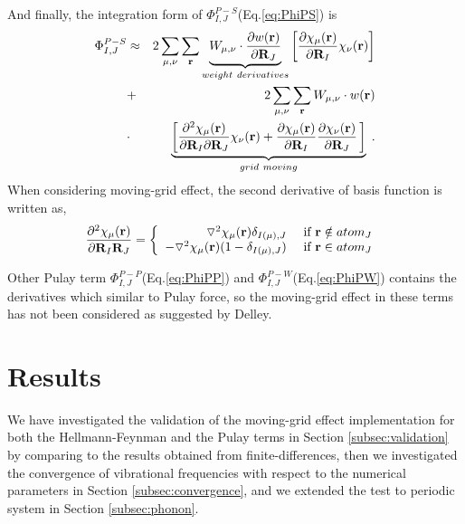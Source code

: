 \documentclass[journal=jpca,manuscript=article]{achemso}
\renewcommand{\vec}[1]{{\bf #1}}
\begin{document}
And finally, the integration form of $\Phi_{I,J}^{P-S}$(Eq.\ref{eq:PhiPS}) is
\begin{eqnarray}
\Phi_{I,J}^{P-S} & \approx &  
2 \sum_{\mu,\nu} \sum_{\mathbf{r}} 
\underbrace{W_{\mu,\nu}\cdot \dfrac{\partial w(\mathbf{r})}{\partial  \mathbf{R}_{J} } }_{weight \ derivatives}
\left[\dfrac{\partial \chi_{\mu}(\mathbf{r})}{\partial  \mathbf{R}_{I} } \chi_{\nu}(\mathbf{r}) \right]
 \nonumber \\
&+ &2\sum_{\mu,\nu} \sum_{\mathbf{r}} 
W_{\mu,\nu} \cdot w(\mathbf{r}) \nonumber \\ 
&\cdot&\underbrace{\left[
 \dfrac{\partial^2 \chi_{\mu }(\mathbf{r})}{\partial  \mathbf{R}_{I}\partial  \mathbf{R}_{J} }\chi_{\nu}(\mathbf{r}) + \dfrac{\partial \chi_{\mu}(\mathbf{r})}{\partial  \mathbf{R}_{I} }\frac{\partial \chi_{\nu}(\mathbf{r})}{\partial \vec{R}_{J}} \,
\right]}_{grid \ moving} \;.  
\label{eq:PhiPS_moving}
\end{eqnarray}
When considering moving-grid effect, the second derivative of basis function is written as,
\begin{equation}
\frac{\partial^2 \chi_{\mu}(\vec{r})}{\partial \vec{R}_{I}\vec{R}_{J}} = \left\{ \begin{array}{rl}
 \triangledown^2 \chi_{\mu}(\vec{r})\delta_{I(\mu),J} &\mbox{ if $\mathbf{r} \notin atom_{J}$ } \\
  -\triangledown^2 \chi_{\mu}(\vec{r})(1-\delta_{I(\mu),J}) &\mbox{ if $\mathbf{r} \in atom_{J}$}
       \end{array} \right.
       \label{eq:basis_moving}
\end{equation}

Other Pulay term $\Phi_{I,J}^{P-P}$(Eq.\ref{eq:PhiPP}) and  
$\Phi_{I,J}^{P-W}$(Eq.\ref{eq:PhiPW}) contains
the derivatives which similar to Pulay force, so
the moving-grid effect in these terms has not been considered as suggested by Delley\cite{Delley1991}.


\section{Results}
\label{sec:results}
We have investigated the validation of the moving-grid effect implementation for both the Hellmann-Feynman and the Pulay terms in Section \ref{subsec:validation} by comparing to the results obtained from finite-differences,  then we investigated the convergence of vibrational frequencies with respect to the numerical parameters in Section \ref{subsec:convergence}, and we extended the test to periodic system in Section \ref{subsec:phonon}.
\end{document}
